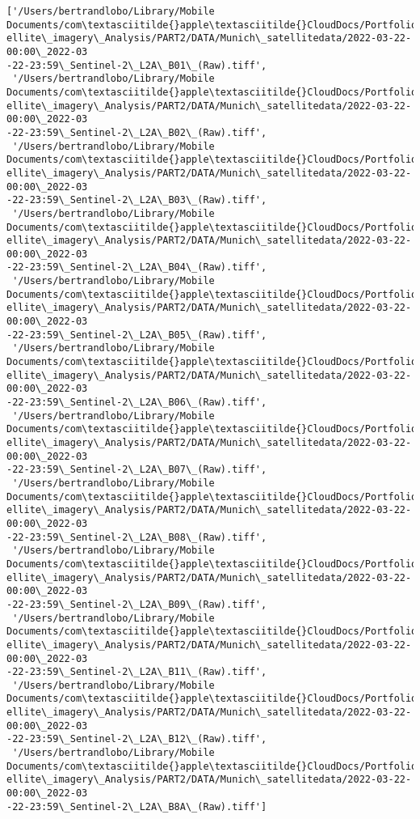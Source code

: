 \documentclass[11pt]{article}
\makeatletter
\newcommand{\boxspacing}{\kern\kvtcb@left@rule\kern\kvtcb@boxsep}
\newcommand{\prompt}[4]{
        {\ttfamily\llap{{\color{#2}[#3]:\hspace{3pt}#4}}\vspace{-\baselineskip}}
    }
\makeatother
\begin{document}
            \begin{tcolorbox}[breakable, size=fbox, boxrule=.5pt, pad at break*=1mm, opacityfill=0]
\prompt{Out}{outcolor}{49}{\boxspacing}
\begin{Verbatim}[commandchars=\\\{\}]
['/Users/bertrandlobo/Library/Mobile Documents/com\textasciitilde{}apple\textasciitilde{}CloudDocs/Portfolio/Sat
ellite\_imagery\_Analysis/PART2/DATA/Munich\_satellitedata/2022-03-22-00:00\_2022-03
-22-23:59\_Sentinel-2\_L2A\_B01\_(Raw).tiff',
 '/Users/bertrandlobo/Library/Mobile Documents/com\textasciitilde{}apple\textasciitilde{}CloudDocs/Portfolio/Sat
ellite\_imagery\_Analysis/PART2/DATA/Munich\_satellitedata/2022-03-22-00:00\_2022-03
-22-23:59\_Sentinel-2\_L2A\_B02\_(Raw).tiff',
 '/Users/bertrandlobo/Library/Mobile Documents/com\textasciitilde{}apple\textasciitilde{}CloudDocs/Portfolio/Sat
ellite\_imagery\_Analysis/PART2/DATA/Munich\_satellitedata/2022-03-22-00:00\_2022-03
-22-23:59\_Sentinel-2\_L2A\_B03\_(Raw).tiff',
 '/Users/bertrandlobo/Library/Mobile Documents/com\textasciitilde{}apple\textasciitilde{}CloudDocs/Portfolio/Sat
ellite\_imagery\_Analysis/PART2/DATA/Munich\_satellitedata/2022-03-22-00:00\_2022-03
-22-23:59\_Sentinel-2\_L2A\_B04\_(Raw).tiff',
 '/Users/bertrandlobo/Library/Mobile Documents/com\textasciitilde{}apple\textasciitilde{}CloudDocs/Portfolio/Sat
ellite\_imagery\_Analysis/PART2/DATA/Munich\_satellitedata/2022-03-22-00:00\_2022-03
-22-23:59\_Sentinel-2\_L2A\_B05\_(Raw).tiff',
 '/Users/bertrandlobo/Library/Mobile Documents/com\textasciitilde{}apple\textasciitilde{}CloudDocs/Portfolio/Sat
ellite\_imagery\_Analysis/PART2/DATA/Munich\_satellitedata/2022-03-22-00:00\_2022-03
-22-23:59\_Sentinel-2\_L2A\_B06\_(Raw).tiff',
 '/Users/bertrandlobo/Library/Mobile Documents/com\textasciitilde{}apple\textasciitilde{}CloudDocs/Portfolio/Sat
ellite\_imagery\_Analysis/PART2/DATA/Munich\_satellitedata/2022-03-22-00:00\_2022-03
-22-23:59\_Sentinel-2\_L2A\_B07\_(Raw).tiff',
 '/Users/bertrandlobo/Library/Mobile Documents/com\textasciitilde{}apple\textasciitilde{}CloudDocs/Portfolio/Sat
ellite\_imagery\_Analysis/PART2/DATA/Munich\_satellitedata/2022-03-22-00:00\_2022-03
-22-23:59\_Sentinel-2\_L2A\_B08\_(Raw).tiff',
 '/Users/bertrandlobo/Library/Mobile Documents/com\textasciitilde{}apple\textasciitilde{}CloudDocs/Portfolio/Sat
ellite\_imagery\_Analysis/PART2/DATA/Munich\_satellitedata/2022-03-22-00:00\_2022-03
-22-23:59\_Sentinel-2\_L2A\_B09\_(Raw).tiff',
 '/Users/bertrandlobo/Library/Mobile Documents/com\textasciitilde{}apple\textasciitilde{}CloudDocs/Portfolio/Sat
ellite\_imagery\_Analysis/PART2/DATA/Munich\_satellitedata/2022-03-22-00:00\_2022-03
-22-23:59\_Sentinel-2\_L2A\_B11\_(Raw).tiff',
 '/Users/bertrandlobo/Library/Mobile Documents/com\textasciitilde{}apple\textasciitilde{}CloudDocs/Portfolio/Sat
ellite\_imagery\_Analysis/PART2/DATA/Munich\_satellitedata/2022-03-22-00:00\_2022-03
-22-23:59\_Sentinel-2\_L2A\_B12\_(Raw).tiff',
 '/Users/bertrandlobo/Library/Mobile Documents/com\textasciitilde{}apple\textasciitilde{}CloudDocs/Portfolio/Sat
ellite\_imagery\_Analysis/PART2/DATA/Munich\_satellitedata/2022-03-22-00:00\_2022-03
-22-23:59\_Sentinel-2\_L2A\_B8A\_(Raw).tiff']
\end{Verbatim}
\end{tcolorbox}
        
\end{document}
